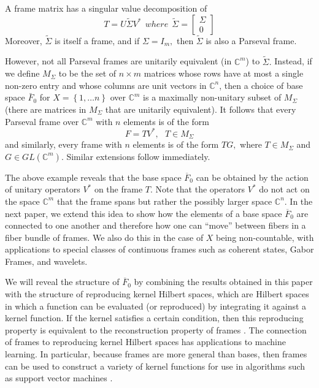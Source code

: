 \documentclass{article}
\newcommand{\Fbar}{\overline{F}}
\newcommand{\CC}{\mathbb{C}}
\begin{document}
A frame matrix has a singular value decomposition of 
\[
T=U\tilde{\Sigma}V^{\ast }\ \ where\ \ \tilde{\Sigma}=
\left[ \begin{array}{c}
           \Sigma  \\ 
             0
       \end{array}
\right] 
\]
Moreover, $\tilde{\Sigma}$ is itself a frame, and if $\Sigma =I_{m},$ then $\tilde{\Sigma}$ is also a Parseval frame. 

However, not all Parseval frames are unitarily equivalent (in $\mathbb{C}^{m}$) to $\tilde{\Sigma}.$ Instead, if we define $M_{\Sigma }$ to be the set of $n\times m$ matrices whose rows
have at most a single non-zero entry and whose columns are unit vectors in $\mathbb{C}^{n}$, then a choice of base space $\bar{F}_{0}$ for $X=\left\{1,\ldots n\right\} $ over $\mathbb{C}^{m}$ is a maximally non-unitary subset of $M_{\Sigma }$ (there are matrices in $M_{\Sigma }$ that are unitarily equivalent).  It follows that every Parseval frame over $\mathbb{C}^{m}$ with $n$ elements  is of the form 
\[
F=TV^{\ast },\ \ \ T\in M_{\Sigma }
\]
and similarly, every frame with $n$ elements is of the form $TG,$ where $T\in M_{\Sigma }$ and $G\in GL\left( \mathbb{C}^{m}\right) .$ Similar extensions follow immediately.

The above example reveals that the base space $\Fbar_0$ can be obtained by the action of unitary operators $V^*$ on the frame $T$. Note that the operators $V^*$ do not act on the space $\CC^m$ that the frame spans but rather the possibly larger space $\CC^n$. In the next paper, we extend this idea to show how the elements of a base space $\Fbar_0$ are connected to one another and therefore how one can ``move'' between fibers in a fiber bundle of frames. We also do this in the case of $X$ being non-countable, with applications to special classes of continuous
frames such as coherent states, Gabor Frames, and wavelets.

We will reveal the structure of $\Fbar_0$ by combining the results obtained in this paper with the structure of reproducing kernel Hilbert spaces, which are Hilbert spaces in which a function can be evaluated (or reproduced) by integrating it against a kernel function. If the kernel satisfies a certain condition, then this reproducing property is equivalent to the reconstruction property of frames \cite{ali2014coherent}. The connection of frames to reproducing kernel Hilbert spaces has applications to machine learning. In particular, because frames are more general than bases, then frames can be used to construct a variety of kernel functions for use in algorithms such as support vector machines \cite{rakotomamonjy2005frames}.
\end{document}
